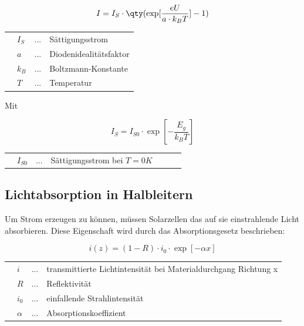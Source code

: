 \documentclass[slug=SZ, room=Hermann-Krone-Bau\,\ Labor\ 1.25,
supervisor=Martin\ Kroll, coursedate=14.\ 11.\ 2019]{../../Lab_Report_LaTeX/lab_report}
\begin{document}
\begin{equation}\label{eq:shockley}
        I = I_S \cdot \qty(\exp[\frac{eU}{a \cdot k_B T}]-1)
\end{equation}

\begin{tabular}{llll}
         & \(I_S\) & ... & Sättigungsstrom        \\
         & \(a\)   & ... & Diodenidealitätsfaktor \\
         & \(k_B\) & ... & Boltzmann-Konstante    \\
         & \(T\)   & ... & Temperatur
\end{tabular}

\newpage

Mit

\begin{equation}\label{eq:sattigstrom}
        I_S = I_{S0} \cdot \exp[-\frac{E_g}{k_B T}]
\end{equation}

\begin{tabular}{lllllll}
         & \(I_{S0}\) & ... & Sättigungsstrom bei \(T=0 K\) &
\end{tabular}

\subsection{Lichtabsorption in Halbleitern}
\label{sec:absorp}

Um Strom erzeugen zu können, müssen Solarzellen das auf sie einstrahlende Licht absorbieren.
Diese Eigenschaft wird durch das Absorptionsgesetz beschrieben:

\begin{equation}\label{eq:absorp}
        i(z) = (1-R) \cdot i_0 \cdot \exp[-\alpha x]
\end{equation}

\begin{tabular}{llll}
         & \(i\)      & ... & transmittierte Lichtintensität bei Materialdurchgang Richtung x \\
         & \(R\)      & ... & Reflektivität                                                   \\
         & \(i_0\)    & ... & einfallende Strahlintensität                                    \\
         & \(\alpha\) & ... & Absorptionskoeffizient
\end{tabular}\\ \\
\end{document}
